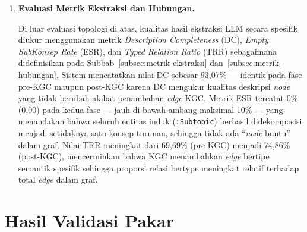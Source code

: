 \documentclass[main]{subfiles}
\begin{document}
\begin{enumerate}
  \textit{Modularity} di sini dihitung atas partisi komunitas \textbf{tetap}
  berdasarkan mata pelajaran (Fisika, Kimia, Biologi), sesuai dengan
  formulasi pada Subbab~\ref{subsec:metrik-topologi}. Dengan demikian, perubahan
  nilai $Q$ murni mencerminkan bertambahnya \textit{edge} lintas-mapel.
  Analisis struktur komunitas menggunakan metrik \textit{Modularity} pada fase
  pre-KGC mencatatkan nilai 0{,}811, yang mengindikasikan struktur komunitas yang
  sangat kuat --- ketiga komunitas mapel (Fisika, Kimia, Biologi) hampir sepenuhnya
  terisolasi satu sama lain, sejalan dengan kondisi \textit{siloed learning} yang
  diidentifikasi sebagai masalah penelitian. Setelah KGC, nilai \textit{Modularity}
  turun secara signifikan menjadi 0{,}373, menandakan bahwa relasi lintas-buku yang
  ditambahkan berhasil menjembatani ketiga komunitas tersebut dan mengurangi
  keterpisahan topologis antar-disiplin. Penurunan ini merupakan indikator
  keberhasilan utama \textit{pipeline}, karena penurunan \textit{Modularity}
  mencerminkan peningkatan interkoneksi lintas-komunitas sebagaimana dirumuskan
  pada Subbab~\ref{subsec:metrik-topologi}.

  \item \textbf{Evaluasi Metrik Ekstraksi dan Hubungan.}

  Di luar evaluasi topologi di atas, kualitas hasil ekstraksi LLM secara
  spesifik diukur menggunakan metrik \textit{Description Completeness} (DC),
  \textit{Empty SubKonsep Rate} (ESR), dan
  \textit{Typed Relation Ratio} (TRR) sebagaimana didefinisikan pada
  Subbab~\ref{subsec:metrik-ekstraksi} dan~\ref{subsec:metrik-hubungan}.
  Sistem mencatatkan nilai DC sebesar 93{,}07\% --- identik pada
  fase pre-KGC maupun post-KGC karena DC mengukur kualitas deskripsi \textit{node} yang
  tidak berubah akibat penambahan \textit{edge} KGC. Metrik ESR tercatat 0\%
  (0,00) pada kedua fase --- jauh di bawah ambang maksimal 10\% --- yang
  menandakan bahwa seluruh entitas induk (\texttt{:Subtopic}) berhasil
  didekomposisi menjadi setidaknya satu konsep turunan, sehingga tidak ada
  ``\textit{node} buntu'' dalam graf. Nilai TRR meningkat dari
  69{,}69\% (pre-KGC) menjadi 74{,}86\% (post-KGC), mencerminkan bahwa KGC
  menambahkan \textit{edge} bertipe semantik spesifik sehingga proporsi relasi
  bertype meningkat relatif terhadap total \textit{edge} dalam graf.
\end{enumerate}

\section{Hasil Validasi Pakar}\label{subsec:validasi-pakar}
\end{document}

